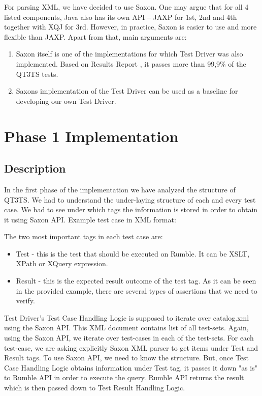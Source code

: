 For parsing XML, we have decided to use Saxon. One may argue that for all 4 listed components, Java also has its own API – JAXP for 1st, 2nd and 4th together with XQJ for 3rd. However, in practice, Saxon is easier to use and more flexible than JAXP. Apart from that, main arguments are:
\begin{enumerate}
	\item Saxon itself is one of the implementations for which Test Driver was also implemented. Based on Results Report \cite{SaxonReport}, it passes more than 99,9\% of the QT3TS tests.
	\item Saxons implementation of the Test Driver can be used as a baseline for developing our own Test Driver. 
\end{enumerate}

\section{Phase 1 Implementation}
\subsection{Description}
\label{Phase1_Description}
In the first phase of the implementation we have analyzed the structure of QT3TS. We had to understand the under-laying structure of each and every test case. We had to see under which tags the information is stored in order to obtain it using Saxon API. Example test case in XML format:



The two most important tags in each test case are:
\begin{itemize}
	\item Test  - this is the test that should be executed on Rumble. It can be XSLT, XPath or XQuery expression.
	\item Result - this is the expected result outcome of the test tag. As it can be seen in the provided example, there are several types of assertions that we need to verify.
\end{itemize}

Test Driver's Test Case Handling Logic is supposed to iterate over catalog.xml using the Saxon API. This XML document contains list of all test-sets. Again, using the Saxon API, we iterate over test-cases in each of the test-sets. For each test-case, we are asking explicitly Saxon XML parser to get items under Test and Result tags. To use Saxon API, we need to know the structure. But, once Test Case Handling Logic obtains information under Test tag, it passes it down "as is" to Rumble API in order to execute the query. Rumble API returns the result which is then passed down to Test Result Handling Logic. 

